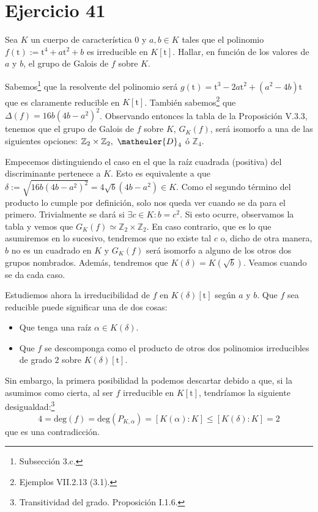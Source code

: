 \section{Ejercicio 41}
\begin{enun}
    Sea $K$ un cuerpo de característica $0$ y $a, b \in K$ tales que el polinomio $f\left( \mathrm{t} \right) := \mathrm{t}^4 + a \mathrm{t}^2 + b$ es irreducible en $K\left[\mathrm{t}\right]$.
    Hallar, en función de los valores de $a$ y $b$, el grupo de Galois de $f$ sobre $K$.
\end{enun}

\begin{sol}
    Sabemos\footnote{Subsección 3.c\cite{cuerpos}.} que la resolvente del polinomio será $g\left( \mathrm{t} \right) = \mathrm{t}^3 - 2a \mathrm{t}^2 + \left( a^2 - 4b \right)\mathrm{t}$ que es claramente reducible en $K\left[\mathrm{t}\right]$. También sabemos\footnote{Ejemplos VII.2.13 (3.1)\cite{anillos}.} que $\Delta\left( f \right) = 16b\left( 4b - a^2 \right)^2$. Observando entonces la tabla de la Proposición V.3.3\cite{cuerpos}, tenemos que el grupo de Galois de $f$ sobre $K$, $G_K\left( f \right)$, será isomorfo a una de las siguientes opciones: $\mathbb{Z}_2 \times \mathbb{Z}_2,\ \matheuler{D}_4$ ó $\mathbb{Z}_4$.

    Empecemos distinguiendo el caso en el que la raíz cuadrada (positiva) del discriminante pertenece a $K$. Esto es equivalente a que $\delta := \sqrt{16b\left( 4b - a^2 \right)^2} = 4 \sqrt{b} \left( 4b - a^2 \right) \in K$. Como el segundo término del producto lo cumple por definición, solo nos queda ver cuando se da para el primero. Trivialmente se dará si $\exists c \in K : b = c^2$. Si esto ocurre, observamos la tabla y vemos que $\boxed{G_K\left( f \right) \simeq \mathbb{Z}_2 \times \mathbb{Z}_2}$. En caso contrario, que es lo que asumiremos en lo sucesivo, tendremos que no existe tal $c$ o, dicho de otra manera, $b$ no es un cuadrado en $K$ y $G_K\left( f \right)$ será isomorfo a alguno de los otros dos grupos nombrados. Además, tendremos que $K\left( \delta \right) = K\left( \sqrt{b} \right)$. Veamos cuando se da cada caso.

    Estudiemos ahora la irreducibilidad de $f$ en $K\left( \delta \right)\left[ \mathrm{t} \right]$ según $a$ y $b$. Que $f$ sea reducible puede significar una de dos cosas:
    \begin{itemize}
        \item Que tenga una raíz $\alpha \in K\left( \delta \right)$.
        \item Que $f$ se descomponga como el producto de otros dos polinomios irreducibles de grado $2$ sobre $K\left( \delta \right)\left[ \mathrm{t} \right]$.
    \end{itemize}
    Sin embargo, la primera posibilidad la podemos descartar debido a que, si la asumimos como cierta, al ser $f$ irreducible en $K\left[ \mathrm{t} \right]$, tendríamos la siguiente desigualdad:\footnote{Transitividad del grado. Proposición I.1.6\cite{cuerpos}.}
    \[
    4 = \mathrm{deg}\left( f \right) = \mathrm{deg}\left( P_{K, \alpha} \right) = \left[ K\left( \alpha \right) : K \right] \le \left[ K\left( \delta \right) : K \right] = 2
    \]
    que es una contradicción.


\end{sol}
